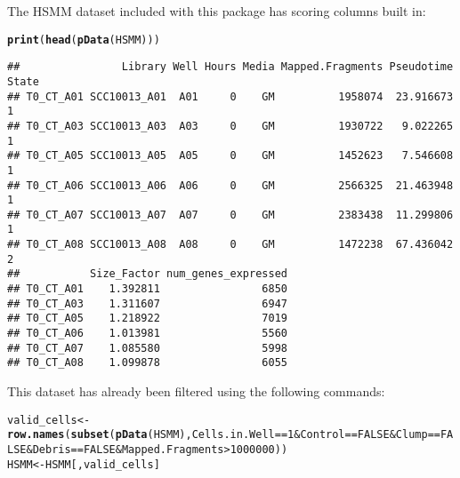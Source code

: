 \documentclass[10pt,oneside]{article}\usepackage[]{graphicx}\usepackage[]{color}
\makeatletter
\newcommand{\hlnum}[1]{\textcolor[rgb]{0.686,0.059,0.569}{#1}}%
\newcommand{\hlopt}[1]{\textcolor[rgb]{0,0,0}{#1}}%
\newcommand{\hlstd}[1]{\textcolor[rgb]{0.345,0.345,0.345}{#1}}%
\newcommand{\hlkwb}[1]{\textcolor[rgb]{0.69,0.353,0.396}{#1}}%
\newcommand{\hlkwd}[1]{\textcolor[rgb]{0.737,0.353,0.396}{\textbf{#1}}}%
\newenvironment{kframe}{%
 \def\at@end@of@kframe{}%
 \ifinner\ifhmode%
  \def\at@end@of@kframe{\end{minipage}}%
  \begin{minipage}{\columnwidth}%
 \fi\fi%
 \def\FrameCommand##1{\hskip\@totalleftmargin \hskip-\fboxsep
 \colorbox{shadecolor}{##1}\hskip-\fboxsep
     \hskip-\linewidth \hskip-\@totalleftmargin \hskip\columnwidth}%
 \MakeFramed {\advance\hsize-\width
   \@totalleftmargin\z@ \linewidth\hsize
   \@setminipage}}%
 {\par\unskip\endMakeFramed%
 \at@end@of@kframe}
\newenvironment{knitrout}{}{} %
\makeatother
\begin{document}
 The HSMM dataset included with this package has scoring columns built in: 
\begin{knitrout}
\color{fgcolor}\begin{kframe}
\begin{alltt}
\hlkwd{print}\hlstd{(}\hlkwd{head}\hlstd{(}\hlkwd{pData}\hlstd{(HSMM)))}
\end{alltt}
\begin{verbatim}
##                Library Well Hours Media Mapped.Fragments Pseudotime State
## T0_CT_A01 SCC10013_A01  A01     0    GM          1958074  23.916673     1
## T0_CT_A03 SCC10013_A03  A03     0    GM          1930722   9.022265     1
## T0_CT_A05 SCC10013_A05  A05     0    GM          1452623   7.546608     1
## T0_CT_A06 SCC10013_A06  A06     0    GM          2566325  21.463948     1
## T0_CT_A07 SCC10013_A07  A07     0    GM          2383438  11.299806     1
## T0_CT_A08 SCC10013_A08  A08     0    GM          1472238  67.436042     2
##           Size_Factor num_genes_expressed
## T0_CT_A01    1.392811                6850
## T0_CT_A03    1.311607                6947
## T0_CT_A05    1.218922                7019
## T0_CT_A06    1.013981                5560
## T0_CT_A07    1.085580                5998
## T0_CT_A08    1.099878                6055
\end{verbatim}
\end{kframe}
\end{knitrout}
 
 This dataset has already been filtered using the following commands: 
 
\begin{knitrout}
\color{fgcolor}\begin{kframe}
\begin{alltt}
\hlstd{valid_cells} \hlkwb{<-} \hlkwd{row.names}\hlstd{(}\hlkwd{subset}\hlstd{(}\hlkwd{pData}\hlstd{(HSMM), Cells.in.Well} \hlopt{==} \hlnum{1} \hlopt{&} \hlstd{Control} \hlopt{==} \hlnum{FALSE} \hlopt{&} \hlstd{Clump} \hlopt{==} \hlnum{FALSE} \hlopt{&} \hlstd{Debris} \hlopt{==} \hlnum{FALSE} \hlopt{&} \hlstd{Mapped.Fragments} \hlopt{>} \hlnum{1000000}\hlstd{))}
\hlstd{HSMM} \hlkwb{<-} \hlstd{HSMM[,valid_cells]}
\end{alltt}
\end{kframe}
\end{knitrout}
 
\end{document}
